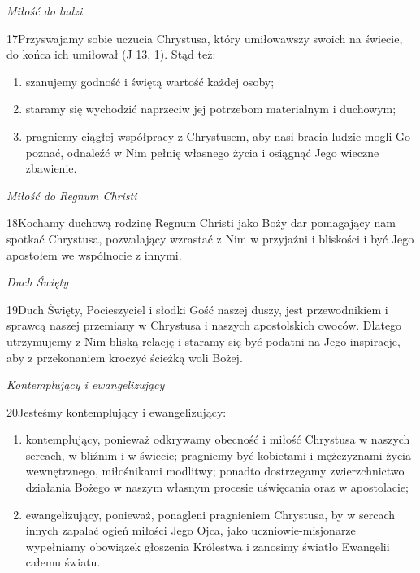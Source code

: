 ﻿\documentclass{book}
\newcommand{\lett}[1]{\lettrine[findent=6pt]{#1}}
\newcommand{\ssec}[1]{\vspace{1em}\textit{#1}\vspace{.5em}\nopagebreak}
\begin{document}
\ssec{Miłość do ludzi}
 
\lett{17} Przyswajamy sobie uczucia Chrystusa, który umiłowawszy swoich na świecie, do końca ich umiłował (J 13, 1). Stąd też:


\begin{enumerate}


\item szanujemy godność i świętą wartość każdej osoby;


\item staramy się wychodzić naprzeciw jej potrzebom materialnym i duchowym;


\item pragniemy ciągłej współpracy z Chrystusem, aby nasi bracia-ludzie mogli Go poznać, odnaleźć w Nim pełnię własnego życia i osiągnąć Jego wieczne zbawienie.


\end{enumerate}


\ssec{Miłość do Regnum Christi}
 
\lett{18} Kochamy duchową rodzinę Regnum Christi jako Boży dar pomagający nam spotkać Chrystusa, pozwalający wzrastać z Nim w przyjaźni i bliskości i być Jego apostołem we wspólnocie z innymi.
 
\ssec{Duch Święty}
 
\lett{19} Duch Święty, Pocieszyciel i słodki Gość naszej duszy, jest przewodnikiem i sprawcą naszej przemiany w Chrystusa i naszych apostolskich owoców. Dlatego utrzymujemy z Nim bliską relację i staramy się być podatni na Jego inspiracje, aby z przekonaniem kroczyć ścieżką woli Bożej.
 
\ssec{Kontemplujący i ewangelizujący}
 
\lett{20} Jesteśmy kontemplujący i ewangelizujący:


\begin{enumerate}


\item kontemplujący, ponieważ odkrywamy obecność i miłość Chrystusa w naszych sercach, w bliźnim i w świecie; pragniemy być kobietami i mężczyznami życia wewnętrznego, miłośnikami modlitwy; ponadto dostrzegamy zwierzchnictwo działania Bożego w naszym własnym procesie uświęcania oraz w apostolacie;


\item ewangelizujący, ponieważ, ponagleni pragnieniem Chrystusa, by w sercach innych zapalać ogień miłości Jego Ojca, jako uczniowie-misjonarze wypełniamy obowiązek głoszenia Królestwa i zanosimy światło Ewangelii całemu światu.


\end{enumerate}
\end{document}
